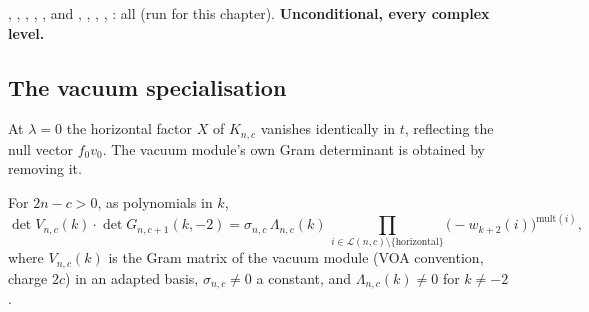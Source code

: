 \begin{status}
\allowbreak{}\allowbreak{}\allowbreak{}\allowbreak{}\allowbreak{},
\allowbreak{}\allowbreak{}\allowbreak{}\allowbreak{}\allowbreak{}\allowbreak{},
\allowbreak{}\allowbreak{}\allowbreak{}\allowbreak{}\allowbreak{}, \allowbreak{}\allowbreak{},
\allowbreak{}\allowbreak{}\allowbreak{}, and \allowbreak{}\allowbreak{}\allowbreak{}\allowbreak{},
\allowbreak{}, \allowbreak{}\allowbreak{}\allowbreak{},
\allowbreak{}\allowbreak{}, \allowbreak{}\allowbreak{}: all \lean{[propext,
Classical.}\allowbreak{}\allowbreak\lean{sound]} (run for this chapter). \textbf{Unconditional, every complex level.}
\end{status}

\subsection{The vacuum specialisation}

At $\lambda=0$ the horizontal factor $X$ of $K_{n,c}$ vanishes identically in $t$, reflecting the null vector
$f_0v_0$. The vacuum module's own Gram determinant is obtained by removing it.

\begin{theorem}\label{l08:thm:vaccoef}
For $2n-c>0$, as polynomials in $k$,
\begin{equation*}
  \det V_{n,c}(k)\cdot\det G_{n,c+1}(k,-2) = \sigma_{n,c}\,\Lambda_{n,c}(k)\,\prod_{i\in\mathcal L(n,c)\setminus\{\text{horizontal}\}}
  \bigl(-w_{k+2}(i)\bigr)^{\mathrm{mult}(i)},
\end{equation*}
where $V_{n,c}(k)$ is the Gram matrix of the vacuum module (VOA convention, charge $2c$) in an adapted
basis, $\sigma_{n,c}\ne0$ a constant, and $\Lambda_{n,c}(k)\ne0$ for $k\ne-2$.
\end{theorem}

